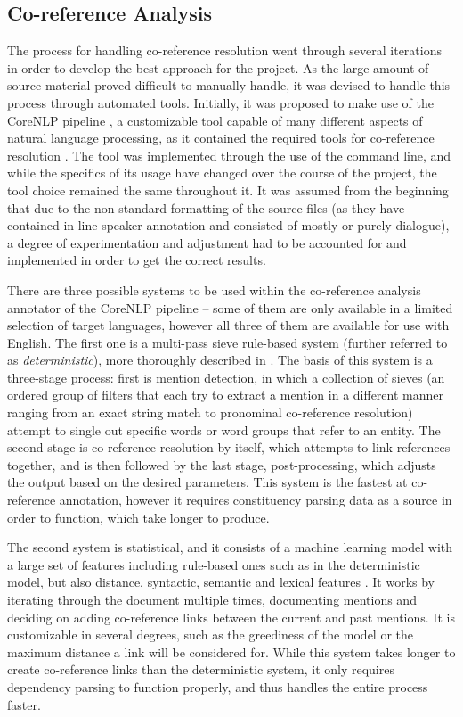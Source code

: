 \documentclass[a4paper, 11pt]{article}
\begin{document}
\subsection{Co-reference Analysis} \label{met:coref}
The process for handling co-reference resolution went through several iterations in order to develop the best approach for the project. As the large amount of source material proved difficult to manually handle, it was devised to handle this process through automated tools. Initially, it was proposed to make use of the CoreNLP pipeline \citep{manning-EtAl:2014:P14-5}, a customizable tool capable of many different aspects of natural language processing, as it contained the required tools for co-reference resolution \citep{recasens_demarneffe_potts2013,lee11conllst,raghunathan2010}. The tool was implemented through the use of the command line, and while the specifics of its usage have changed over the course of the project, the tool choice remained the same throughout it. It was assumed from the beginning that due to the non-standard formatting of the source files (as they have contained in-line speaker annotation and consisted of mostly or purely dialogue), a degree of experimentation and adjustment had to be accounted for and implemented in order to get the correct results.

There are three possible systems to be used within the co-reference analysis annotator of the CoreNLP pipeline -- some of them are only available in a limited selection of target languages, however all three of them are available for use with English. The first one is a multi-pass sieve rule-based system (further referred to as \textit{deterministic}), more thoroughly described in \citet{lee-Etal}. The basis of this system is a three-stage process: first is mention detection, in which a collection of sieves (an ordered group of filters that each try to extract a mention in a different manner ranging from an exact string match to pronominal co-reference resolution) attempt to single out specific words or word groups that refer to an entity. The second stage is co-reference resolution by itself, which attempts to link references together, and is then followed by the last stage, post-processing, which adjusts the output based on the desired parameters. This system is the fastest at co-reference annotation, however it requires constituency parsing data as a source in order to function, which take longer to produce.

The second system is statistical, and it consists of a machine learning model with a large set of features including rule-based ones such as in the deterministic model, but also distance, syntactic, semantic and lexical features \citep{clark2015entity}. It works by iterating through the document multiple times, documenting mentions and deciding on adding co-reference links between the current and past mentions. It is customizable in several degrees, such as the greediness of the model or the maximum distance a link will be considered for. While this system takes longer to create co-reference links than the deterministic system, it only requires dependency parsing to function properly, and thus handles the entire process faster.
\end{document}
